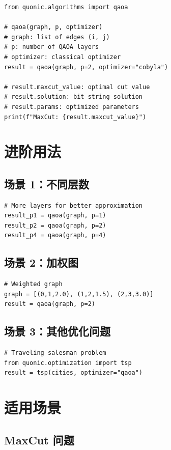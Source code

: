 \documentclass[12pt,a4paper]{article}
\begin{document}
\begin{lstlisting}[style=python]
from quonic.algorithms import qaoa

# qaoa(graph, p, optimizer)
# graph: list of edges (i, j)
# p: number of QAOA layers
# optimizer: classical optimizer
result = qaoa(graph, p=2, optimizer="cobyla")

# result.maxcut_value: optimal cut value
# result.solution: bit string solution
# result.params: optimized parameters
print(f"MaxCut: {result.maxcut_value}")
\end{lstlisting}

\section{进阶用法}

\subsection{场景 1：不同层数}

\begin{lstlisting}[style=python]
# More layers for better approximation
result_p1 = qaoa(graph, p=1)
result_p2 = qaoa(graph, p=2)
result_p4 = qaoa(graph, p=4)
\end{lstlisting}

\subsection{场景 2：加权图}

\begin{lstlisting}[style=python]
# Weighted graph
graph = [(0,1,2.0), (1,2,1.5), (2,3,3.0)]
result = qaoa(graph, p=2)
\end{lstlisting}

\subsection{场景 3：其他优化问题}

\begin{lstlisting}[style=python]
# Traveling salesman problem
from quonic.optimization import tsp
result = tsp(cities, optimizer="qaoa")
\end{lstlisting}

\section{适用场景}

\subsection{MaxCut 问题}
\end{document}
